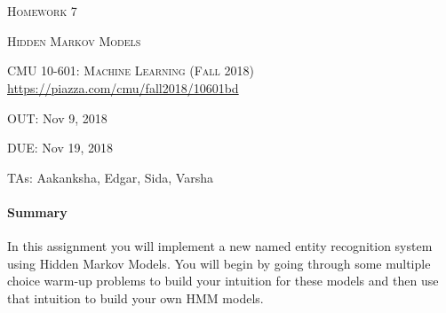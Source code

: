 \documentclass{article}
\begin{document}
\section*{}
\begin{center}
  \centerline{\textsc{\LARGE Homework 7}}
  \vspace{0.5em}
  \centerline{\textsc{\LARGE Hidden Markov Models}}
  \vspace{1em}
  \textsc{\large CMU 10-601: Machine Learning (Fall 2018)} \\
  \url{https://piazza.com/cmu/fall2018/10601bd}
  \centerline{OUT: Nov 9, 2018}
  \centerline{DUE: Nov 19, 2018}
    \centerline{TAs: Aakanksha, Edgar, Sida, Varsha}
\end{center}


\begin{notebox}
\paragraph{Summary} In this assignment you will implement a new named entity recognition system using Hidden Markov Models. You will begin by going through some multiple choice warm-up problems to build your intuition for these models and then use that intuition to build your own HMM models.
\end{notebox}
\end{document}
